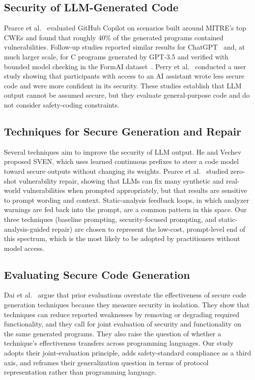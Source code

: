 \documentclass[12pt]{IEEEtran}
\begin{document}
\subsection{Security of LLM-Generated Code}
Pearce et al.~\cite{pearce2022asleep} evaluated GitHub Copilot on scenarios built around MITRE's top CWEs and found that roughly 40\% of the generated programs contained vulnerabilities. Follow-up studies reported similar results for ChatGPT~\cite{khoury2023chatgpt} and, at much larger scale, for C programs generated by GPT-3.5 and verified with bounded model checking in the FormAI dataset~\cite{tihanyi2023formai}. Perry et al.~\cite{perry2023users} conducted a user study showing that participants with access to an AI assistant wrote less secure code and were more confident in its security. These studies establish that LLM output cannot be assumed secure, but they evaluate general-purpose code and do not consider safety-coding constraints.

\subsection{Techniques for Secure Generation and Repair}
Several techniques aim to improve the security of LLM output. He and Vechev~\cite{he2023sven} proposed SVEN, which uses learned continuous prefixes to steer a code model toward secure outputs without changing its weights. Pearce et al.~\cite{pearce2023zeroshot} studied zero-shot vulnerability repair, showing that LLMs can fix many synthetic and real-world vulnerabilities when prompted appropriately, but that results are sensitive to prompt wording and context. Static-analysis feedback loops, in which analyzer warnings are fed back into the prompt, are a common pattern in this space. Our three techniques (baseline prompting, security-focused prompting, and static-analysis-guided repair) are chosen to represent the low-cost, prompt-level end of this spectrum, which is the most likely to be adopted by practitioners without model access.

\subsection{Evaluating Secure Code Generation}
Dai et al.~\cite{rethinking2026} argue that prior evaluations overstate the effectiveness of secure code generation techniques because they measure security in isolation. They show that techniques can reduce reported weaknesses by removing or degrading required functionality, and they call for joint evaluation of security and functionality on the same generated programs. They also raise the question of whether a technique's effectiveness transfers across programming languages. Our study adopts their joint-evaluation principle, adds safety-standard compliance as a third axis, and reframes their generalization question in terms of protocol representation rather than programming language.
\end{document}
